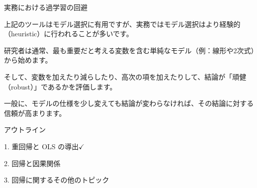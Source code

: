 \documentclass[11pt,handout]{beamer}
\newenvironment{wideitemize}{\itemize\addtolength{\itemsep}{10pt}}{\enditemize}
\begin{document}
\begin{frame}{実務における過学習の回避}
	\begin{wideitemize}
		\item
		上記のツールはモデル選択に有用ですが、実務ではモデル選択はより経験的（heuristic）に行われることが多いです。
		
		\pause
		\item
		研究者は通常、最も重要だと考える変数を含む単純なモデル（例：線形や2次式）から始めます。
		
		\pause
		\item
		そして、変数を加えたり減らしたり、高次の項を加えたりして、結論が「頑健（robust）」であるかを評価します。
		
		\pause
		\item
		一般に、モデルの仕様を少し変えても結論が変わらなければ、その結論に対する信頼が高まります。

	\end{wideitemize}	
\end{frame}

	
	\begin{frame}{アウトライン}

	\textcolor{red!75!green!50!blue!25!gray}{1. 重回帰と OLS の導出}$\checkmark$
	\vspace{0.8cm}
	
	2. 回帰と因果関係
	\vspace{0.8cm}
	
	\textcolor{red!75!green!50!blue!25!gray}{3. 回帰に関するその他のトピック}
	
	\end{frame}
\end{document}
